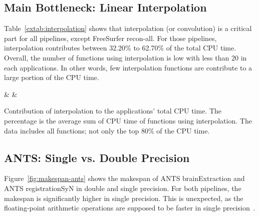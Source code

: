 \documentclass[conference]{IEEEtran}
\begin{document}
\subsection{Main Bottleneck: Linear Interpolation}
Table~\ref{extab:interpolation} shows that interpolation (or convolution) is a critical part for all pipelines, except FreeSurfer recon-all. For those pipelines, interpolation contributes between 32.20\% to 62.70\% of the total CPU time. Overall, the number of functions using interpolation is low with less than 20 in each applications. In other words, few interpolation functions are contribute to a large portion of the CPU time.
			
\begin{table}[ht]
	\centering
	{\pipeline & \nfunc & \tablenum[round-precision=2]{\cputime}}
	\caption{Contribution of interpolation to the applications' total CPU time. The percentage is the average sum of CPU time of functions using interpolation. The data includes all functions; not only the top 80\% of the CPU time.}
	\label{extab:interpolation}
\end{table}
						
						
\subsection{ANTS: Single vs. Double Precision}
Figure~\ref{fig:makespan-ants} shows the makespan of ANTS brainExtraction and ANTS registrationSyN in double and single precision. For both pipelines, the makespan is significantly higher in single precision. This is unexpected, as the floating-point arithmetic operations are supposed to be faster in single precision~\cite{Wang2018-jv}.
\end{document}
